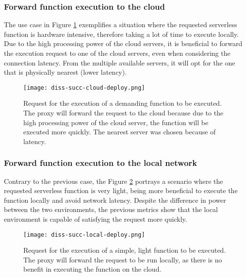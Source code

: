 \subsubsection{Forward function execution to the cloud} \label{usecases:forward_cloud}

The use case in Figure \ref{fig:succ-cloud-deploy} exemplifies a situation where
the requested serverless function is hardware intensive, therefore taking a lot of
time to execute locally. Due to the high processing power of the cloud servers, it
is beneficial to forward the execution request to one of the cloud servers, even
when considering the connection latency. From the multiple available servers, it
will opt for the one that is physically nearest (lower latency).

\begin{figure}[ht]
  \begin{center}
    \texttt{[image: diss-succ-cloud-deploy.png]}
    \caption{Request for the execution of a demanding function to be executed. The proxy will forward the request to the cloud because due to the high processing  power of the cloud server, the function will be executed more quickly. The nearest server was chosen because of latency.}
    \label{fig:succ-cloud-deploy}
  \end{center}
\end{figure}

\subsubsection{Forward function execution to the local network}
\label{usecases:forward_local}

Contrary to the previous case, the Figure \ref{fig:succ-local-deploy} portrays a scenario where the requested serverless function is very light, being more beneficial to execute the function locally and avoid network latency. Despite the difference in power between the two environments, the previous metrics show that
the local environment is capable of satisfying the request more quickly.

\begin{figure}[ht]
  \begin{center}
    \texttt{[image: diss-succ-local-deploy.png]}
    \caption{Request for the execution of a simple, light function to be executed. The proxy will forward the request to be run locally, as there is no benefit in
    executing the function on the cloud.}
    \label{fig:succ-local-deploy}
  \end{center}
\end{figure}

